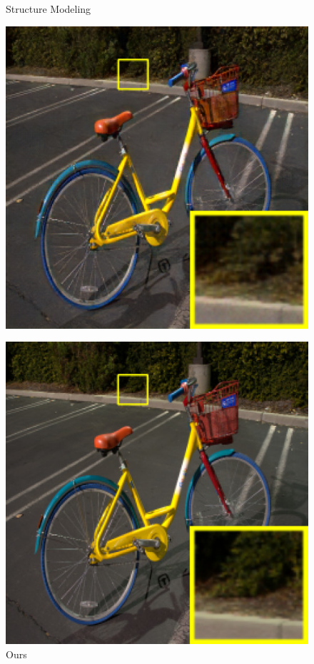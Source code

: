 \documentclass[CJK,aspectratio=169]{beamer}  %
\begin{document}
\begin{frame}
\begin{figure}
\begin{minipage}{.25\textwidth}
				\captionsetup{font=scriptsize}
				\label{fig: Structure Modeling}	
				\caption*{Structure Modeling}
			\end{minipage}
			\begin{minipage}{.25\textwidth}
				\centering
				\includegraphics[width=.8\linewidth]{picture/LLIE/Structure Modeling and Guidance/Ours}
				\captionsetup{font=scriptsize}
				\label{fig: SMG_Ours}	
				\caption*{Ours}
			\end{minipage}
			\begin{minipage}{.25\textwidth}
				\centering
				\includegraphics[width=.8\linewidth]{picture/LLIE/Structure Modeling and Guidance/Ground Truth}

\end{minipage}
\end{figure}
\end{frame}
\end{document}
